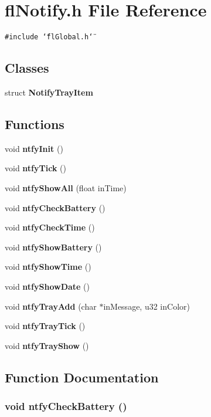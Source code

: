 \section{fl\-Notify.h File Reference}
\label{flNotify_8h}
{\tt \#include \char`\"{}fl\-Global.h\char`\"{}}\par
\subsection*{Classes}
\begin{CompactItemize}
\item 
struct {\bf Notify\-Tray\-Item}
\end{CompactItemize}
\subsection*{Functions}
\begin{CompactItemize}
\item 
void {\bf ntfy\-Init} ()
\item 
void {\bf ntfy\-Tick} ()
\item 
void {\bf ntfy\-Show\-All} (float in\-Time)
\item 
void {\bf ntfy\-Check\-Battery} ()
\item 
void {\bf ntfy\-Check\-Time} ()
\item 
void {\bf ntfy\-Show\-Battery} ()
\item 
void {\bf ntfy\-Show\-Time} ()
\item 
void {\bf ntfy\-Show\-Date} ()
\item 
void {\bf ntfy\-Tray\-Add} (char $\ast$in\-Message, u32 in\-Color)
\item 
void {\bf ntfy\-Tray\-Tick} ()
\item 
void {\bf ntfy\-Tray\-Show} ()
\end{CompactItemize}


\subsection{Function Documentation}
\subsubsection{\setlength{\rightskip}{0pt plus 5cm}void ntfy\-Check\-Battery ()}\label{flNotify_8h_600e4ac54e9fb4dee440b5264b9e1df3}




